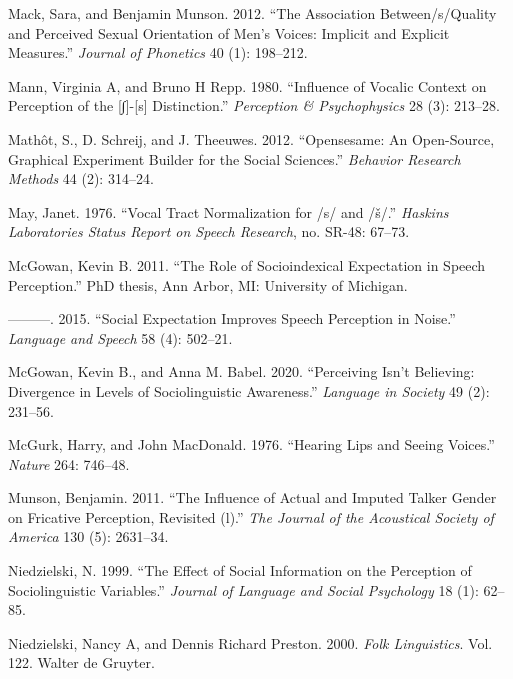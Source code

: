 \documentclass[
  letterpaper,
  DIV=11,
  numbers=noendperiod]{scrartcl}
\newlength{\cslhangindent}
\newenvironment{CSLReferences}[2] %
 {\begin{list}{}{%
  \setlength{\itemindent}{0pt}
  \setlength{\leftmargin}{0pt}
  \setlength{\parsep}{0pt}
  \ifodd #1
   \setlength{\leftmargin}{\cslhangindent}
   \setlength{\itemindent}{-1\cslhangindent}
  \fi
  \setlength{\itemsep}{#2\baselineskip}}}
 {\end{list}}
\begin{document}
\begin{CSLReferences}{1}{0}
Mack, Sara, and Benjamin Munson. 2012. {``The Association
Between/s/Quality and Perceived Sexual Orientation of Men's Voices:
Implicit and Explicit Measures.''} \emph{Journal of Phonetics} 40 (1):
198--212.

Mann, Virginia A, and Bruno H Repp. 1980. {``Influence of Vocalic
Context on Perception of the {[}∫{]}-{[}s{]} Distinction.''}
\emph{Perception \& Psychophysics} 28 (3): 213--28.

Mathôt, S., D. Schreij, and J. Theeuwes. 2012. {``Opensesame: An
Open-Source, Graphical Experiment Builder for the Social Sciences.''}
\emph{Behavior Research Methods} 44 (2): 314--24.

May, Janet. 1976. {``Vocal Tract Normalization for /s/ and /š/.''}
\emph{Haskins Laboratories Status Report on Speech Research}, no. SR-48:
67--73.

McGowan, Kevin B. 2011. {``The Role of Socioindexical Expectation in
Speech Perception.''} PhD thesis, Ann Arbor, MI: University of Michigan.

---------. 2015. {``Social Expectation Improves Speech Perception in
Noise.''} \emph{Language and Speech} 58 (4): 502--21.

McGowan, Kevin B., and Anna M. Babel. 2020. {``Perceiving Isn't
Believing: Divergence in Levels of Sociolinguistic Awareness.''}
\emph{Language in Society} 49 (2): 231--56.

McGurk, Harry, and John MacDonald. 1976. {``Hearing Lips and Seeing
Voices.''} \emph{Nature} 264: 746--48.

Munson, Benjamin. 2011. {``The Influence of Actual and Imputed Talker
Gender on Fricative Perception, Revisited (l).''} \emph{The Journal of
the Acoustical Society of America} 130 (5): 2631--34.

Niedzielski, N. 1999. {``The Effect of Social Information on the
Perception of Sociolinguistic Variables.''} \emph{Journal of Language
and Social Psychology} 18 (1): 62--85.

Niedzielski, Nancy A, and Dennis Richard Preston. 2000. \emph{Folk
Linguistics}. Vol. 122. Walter de Gruyter.


\end{CSLReferences}
\end{document}
